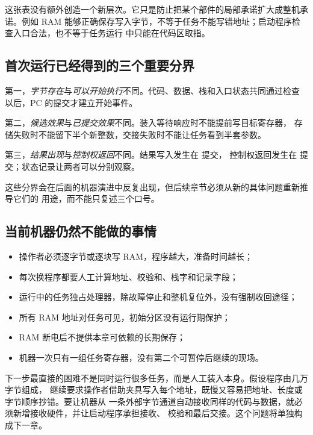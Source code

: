 这张表没有额外创造一个新层次。它只是防止把某个部件的局部承诺扩大成整机承诺。例如 RAM
能够正确保存写入字节，不等于任务不能写错地址；启动程序检查入口合法，也不等于任务运行
中只能在代码区取指。

\subsection{首次运行已经得到的三个重要分界}

第一，\emph{字节存在}与\emph{可以开始执行}不同。代码、数据、栈和入口状态共同通过检查
以后，PC 的提交才建立开始事件。

第二，\emph{候选效果}与\emph{已提交效果}不同。装入等待响应时不能提前写目标寄存器，
存储失败时不能留下半个新整数，交接失败时不能让任务看到半套参数。

第三，\emph{结果出现}与\emph{控制权返回}不同。结果写入发生在  提交，
控制权返回发生在  提交；状态记录让两者可以分别观察。

这些分界会在后面的机器演进中反复出现，但后续章节必须从新的具体问题重新推导它们的
用途，而不能只复述三个口号。

\subsection{当前机器仍然不能做的事情}

\begin{itemize}
\item 操作者必须逐字节或逐块写 RAM，程序越大，准备时间越长；
\item 每次换程序都要人工计算地址、校验和、栈字和记录字段；
\item 运行中的任务独占处理器，除故障停止和整机复位外，没有强制收回途径；
\item 所有 RAM 地址对任务可见，初始分区没有运行期保护；
\item RAM 断电后不提供本章可依赖的长期保存；
\item 机器一次只有一组任务寄存器，没有第二个可暂停后继续的现场。
\end{itemize}

下一步最直接的困难不是同时运行很多任务，而是人工装入本身。假设程序由几万字节组成，
继续要求操作者借助夹具写入每个地址，既慢又容易把地址、长度或字节顺序抄错。要让机器从
一条外部字节通道自动接收同样的代码与数据，就必须新增接收硬件，并让启动程序承担接收、
校验和最后交接。这个问题将单独构成下一章。
